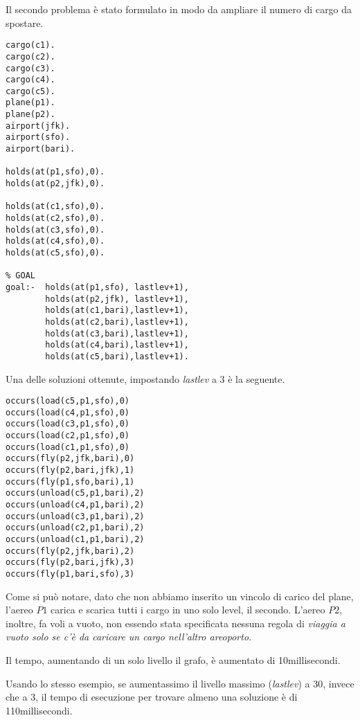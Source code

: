 Il secondo problema è stato formulato in modo da ampliare il numero di cargo da spostare.

\begin{lstlisting}
cargo(c1).
cargo(c2).
cargo(c3).
cargo(c4).
cargo(c5).
plane(p1).
plane(p2).
airport(jfk).
airport(sfo).
airport(bari).

holds(at(p1,sfo),0).
holds(at(p2,jfk),0).

holds(at(c1,sfo),0).
holds(at(c2,sfo),0).
holds(at(c3,sfo),0).
holds(at(c4,sfo),0).
holds(at(c5,sfo),0).

% GOAL
goal:-  holds(at(p1,sfo), lastlev+1),
        holds(at(p2,jfk), lastlev+1),
        holds(at(c1,bari),lastlev+1),
        holds(at(c2,bari),lastlev+1),
        holds(at(c3,bari),lastlev+1),
        holds(at(c4,bari),lastlev+1),
        holds(at(c5,bari),lastlev+1).
\end{lstlisting}

Una delle soluzioni ottenute, impostando \emph{lastlev} a 3 è la seguente.

\begin{lstlisting}
occurs(load(c5,p1,sfo),0)
occurs(load(c4,p1,sfo),0)
occurs(load(c3,p1,sfo),0)
occurs(load(c2,p1,sfo),0)
occurs(load(c1,p1,sfo),0)
occurs(fly(p2,jfk,bari),0)
occurs(fly(p2,bari,jfk),1)
occurs(fly(p1,sfo,bari),1)
occurs(unload(c5,p1,bari),2)
occurs(unload(c4,p1,bari),2)
occurs(unload(c3,p1,bari),2)
occurs(unload(c2,p1,bari),2)
occurs(unload(c1,p1,bari),2)
occurs(fly(p2,jfk,bari),2)
occurs(fly(p2,bari,jfk),3)
occurs(fly(p1,bari,sfo),3)
\end{lstlisting}

Come si può notare, dato che non abbiamo inserito un vincolo di carico del plane, l'aereo $P1$ carica e scarica tutti i cargo in uno solo level, il secondo. L'aereo $P2$, inoltre, fa voli a vuoto, non essendo stata specificata nessuna regola di \emph{viaggia a vuoto solo se c'è da caricare un cargo nell'altro areoporto.}

Il tempo, aumentando di un solo livello il grafo, è aumentato di 10millisecondi.

Usando lo stesso esempio, se aumentassimo il livello massimo (\emph{lastlev}) a 30, invece che a 3, il tempo di esecuzione per trovare almeno una soluzione è di 110millisecondi.
